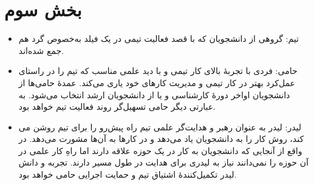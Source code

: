 \documentclass{article}
\begin{document}
\section{بخش سوم}
\begin{itemize}
\item
تیم:
گروهی از دانشجویان که با قصد فعالیت تیمی در یک فیلد به‌خصوص گرد هم جمع شده‌اند.
\item
حامی:
فردی با تجربه‌ٔ بالای کار تیمی و با دید علمی مناسب که تیم را در راستای عمل‌کرد بهتر در کار تیمی و مدیریت کارهای خود یاری می‌کند. عمدهٔ حامی‌ها از دانشجویان اواخر دوره‌ٔ کارشناسی و یا از دانشجویان ارشد انتخاب می‌شود. به عبارتی دیگر حامی تسهیل‌گر روند فعالیت تیم خواهد بود.
\item
لیدر:
لیدر به عنوان رهبر و هدایت‌گر علمی تیم راه پیش‌رو را برای تیم روشن می کند، روش کار را به دانشجویان یاد می‌دهد و در کار‌ها به آن‌ها مشورت می‌دهد. در واقع از آنجایی که دانشجویان به کار در یک حوزه علاقه دارند اما راهِ کار علمی در آن حوزه را نمی‌دانند نیاز به لیدری برای هدایت در  طول مسیر دارند. تجربه و دانش لیدر تکمیل‌کنندهٔ اشتیاق تیم و حمایت اجرایی حامی خواهد بود.
\end{itemize}
\end{document}
